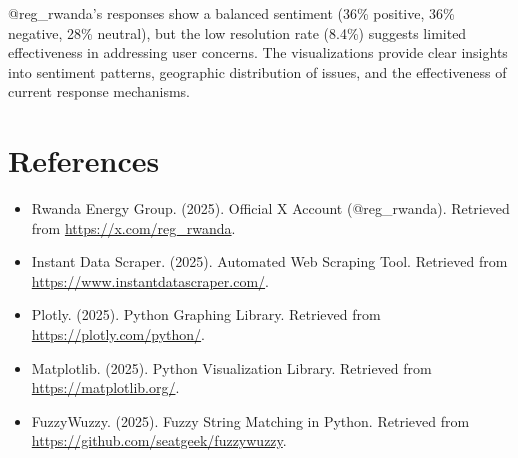 \documentclass[a4paper,12pt]{article}
\begin{document}
	@reg\_rwanda's responses show a balanced sentiment (36\% positive, 36\% negative, 28\% neutral), but the low resolution rate (8.4\%) suggests limited effectiveness in addressing user concerns. The visualizations provide clear insights into sentiment patterns, geographic distribution of issues, and the effectiveness of current response mechanisms.
	
	\section{References}
	\begin{itemize}
		\item Rwanda Energy Group. (2025). Official X Account (@reg\_rwanda). Retrieved from \url{https://x.com/reg_rwanda}.
		\item Instant Data Scraper. (2025). Automated Web Scraping Tool. Retrieved from \url{https://www.instantdatascraper.com/}.
		\item Plotly. (2025). Python Graphing Library. Retrieved from \url{https://plotly.com/python/}.
		\item Matplotlib. (2025). Python Visualization Library. Retrieved from \url{https://matplotlib.org/}.
		\item FuzzyWuzzy. (2025). Fuzzy String Matching in Python. Retrieved from \url{https://github.com/seatgeek/fuzzywuzzy}.
	\end{itemize}
	
\end{document}
